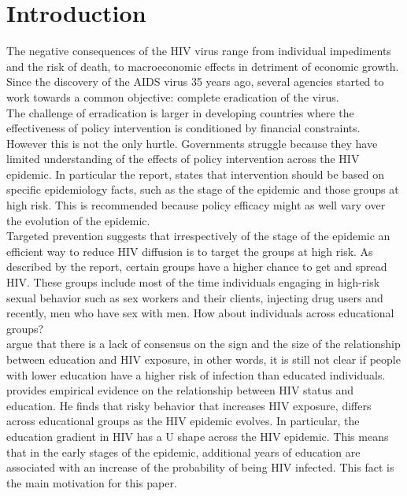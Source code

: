 \section{Introduction} \label{sec1}
The negative consequences of the HIV virus range from individual impediments and the risk of death, to macroeconomic effects in detriment of economic growth. Since the discovery of the AIDS virus 35 years ago, several agencies started to work towards a common objective: complete eradication of the virus.\\
  
The challenge of erradication is larger in developing countries where the effectiveness of policy intervention is conditioned by financial constraints. However this is not the only hurtle. Governments struggle because they have limited understanding of the effects of policy intervention across the HIV epidemic. In particular the \cite{report2} report, states that intervention should be based on specific epidemiology facts, such as the stage of the epidemic and those groups at high risk. This is recommended because policy efficacy might as well vary over the evolution of the epidemic. \\

Targeted prevention suggests that irrespectively of the stage of the epidemic an efficient way to reduce HIV diffusion is to target the groups at high risk. As described by the \cite{report2} report, certain groups have a higher chance to get and spread HIV. These groups include most of the time individuals engaging in high-risk sexual behavior such as sex workers and their clients, injecting drug users and recently, men who have sex with men. How about individuals across educational groups?\\

\cite{beegle} argue that there is a lack of consensus on the sign and the size of the relationship between education and HIV exposure, in other words, it is still not clear if people with lower education have a higher risk of infection than educated individuals. \cite{raul} provides empirical evidence on the relationship between HIV status and education. He finds that risky behavior that increases HIV exposure, differs across educational groups as the HIV epidemic evolves. In particular, the education gradient in HIV has a U shape across the HIV epidemic. This means that in the early stages of the epidemic, additional years of education are associated with an increase of the probability of being HIV infected. This fact is the main motivation for this paper.   \\

